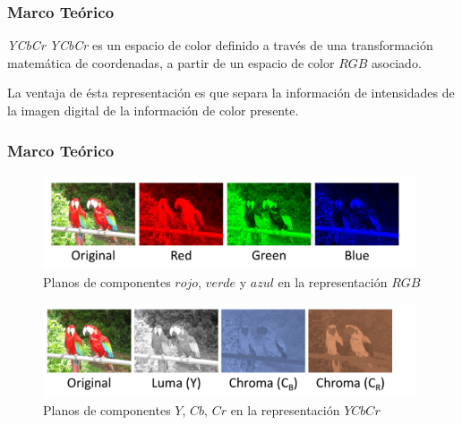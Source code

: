 \documentclass[usenames,dvipsnames]{beamer}
\begin{document}
\begin{frame} 
\frametitle{Marco Teórico} 
\begin{exampleblock}{\textit{YCbCr}}
\textit{YCbCr} es un espacio de color definido a través de una transformación matemática de coordenadas, a partir de un espacio de color $RGB$ asociado.

La ventaja de ésta representación es que separa la información de intensidades de la imagen digital de la información de color presente.
\end{exampleblock}

\centering

\end{frame}

\begin{frame} 
\frametitle{Marco Teórico} 
\vspace{-1cm}
\begin{figure}
  \includegraphics[width=11cm]{graphics/IC676790.png}
  \caption{Planos de componentes $rojo$, $verde$ y $azul$ en la representación $RGB$}
\end{figure}
\vspace{-1cm}
\begin{figure}
  \includegraphics[width=11cm]{graphics/IC676791.png}
  \caption{Planos de componentes $Y$, $Cb$, $Cr$ en la representación $YCbCr$}
\end{figure}


\end{frame}
\end{document}
